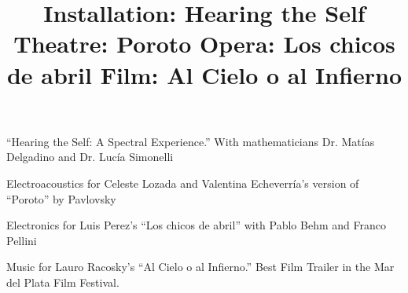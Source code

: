  \title{ Installation: Hearing the Self}
 \begin{position}
``Hearing the Self: A Spectral Experience.'' With mathematicians Dr. Matías Delgadino and Dr. Lucía Simonelli
 \end{position}

 
 \title{ Theatre: Poroto}
 \begin{position}
Electroacoustics for Celeste Lozada and Valentina Echeverría's version of ``Poroto'' by Pavlovsky
 \end{position}

 
 \title{ Opera: Los chicos de abril}
 \begin{position}
Electronics for Luis Perez's ``Los chicos de abril'' with Pablo Behm and Franco Pellini
 \end{position}

 
 
 \title{ Film: Al Cielo o al Infierno}
 \begin{position}
Music for Lauro Racosky's ``Al Cielo o al Infierno.''  Best Film Trailer in the Mar del Plata Film Festival.
 \end{position}

 

 
 
